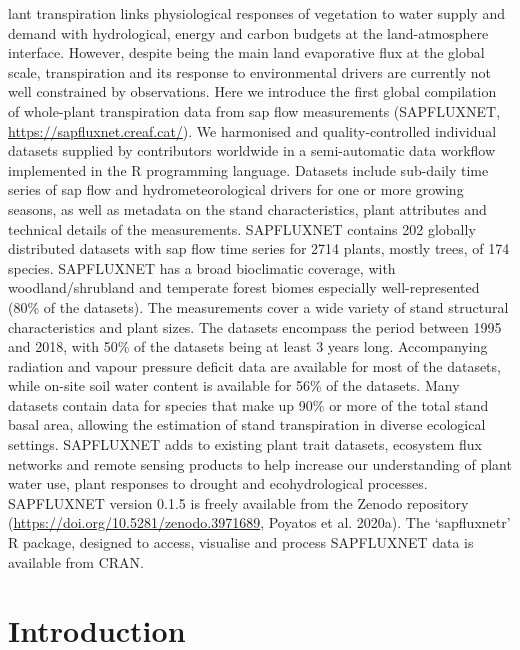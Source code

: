 \documentclass[11pt,twoside]{reedthesis}
\begin{document}
lant transpiration links physiological responses of vegetation to water
supply and demand with hydrological, energy and carbon budgets at the
land-atmosphere interface. However, despite being the main land
evaporative flux at the global scale, transpiration and its response to
environmental drivers are currently not well constrained by
observations. Here we introduce the first global compilation of
whole-plant transpiration data from sap flow measurements (SAPFLUXNET,
\url{https://sapfluxnet.creaf.cat/}). We harmonised and
quality-controlled individual datasets supplied by contributors
worldwide in a semi-automatic data workflow implemented in the R
programming language. Datasets include sub-daily time series of sap flow
and hydrometeorological drivers for one or more growing seasons, as well
as metadata on the stand characteristics, plant attributes and technical
details of the measurements. SAPFLUXNET contains 202 globally
distributed datasets with sap flow time series for 2714 plants, mostly
trees, of 174 species. SAPFLUXNET has a broad bioclimatic coverage, with
woodland/shrubland and temperate forest biomes especially
well-represented (80\% of the datasets). The measurements cover a wide
variety of stand structural characteristics and plant sizes. The
datasets encompass the period between 1995 and 2018, with 50\% of the
datasets being at least 3 years long. Accompanying radiation and vapour
pressure deficit data are available for most of the datasets, while
on-site soil water content is available for 56\% of the datasets. Many
datasets contain data for species that make up 90\% or more of the total
stand basal area, allowing the estimation of stand transpiration in
diverse ecological settings. SAPFLUXNET adds to existing plant trait
datasets, ecosystem flux networks and remote sensing products to help
increase our understanding of plant water use, plant responses to
drought and ecohydrological processes. SAPFLUXNET version 0.1.5 is
freely available from the Zenodo repository
(\url{https://doi.org/10.5281/zenodo.3971689}, Poyatos et al. 2020a).
The `sapfluxnetr' R package, designed to access, visualise and process
SAPFLUXNET data is available from CRAN.\par

\newpage

\section{Introduction}\label{introduction}
\end{document}
